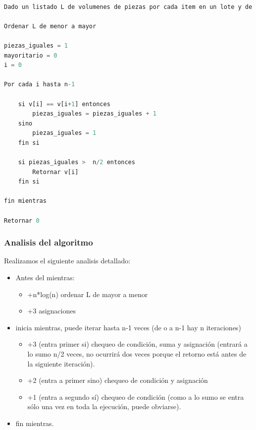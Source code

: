 \documentclass{article}
\begin{document}
\begin{lstlisting}[language=Python, caption=Algoritmo del proceso B]

Dado un listado L de volumenes de piezas por cada item en un lote y de n elementos.

Ordenar L de menor a mayor

piezas_iguales = 1
mayoritario = 0
i = 0

Por cada i hasta n-1 
    
    si v[i] == v[i+1] entonces 
        piezas_iguales = piezas_iguales + 1
    sino
        piezas_iguales = 1
    fin si

    si piezas_iguales >  n/2 entonces
        Retornar v[i]
    fin si

fin mientras

Retornar 0


\end{lstlisting}

\subsubsection{Analisis del algoritmo}

Realizamos el siguiente analisis detallado:

\begin{itemize}
    \item Antes del mientras:
    \begin{itemize}
        \item +n*log(n) ordenar L de mayor a menor
        \item +3 asignaciones
    \end{itemize}
    \item inicia mientras, puede iterar hasta n-1 veces (de o a n-1 hay n iteraciones)
    \begin{itemize}
        \item +3 (entra primer si) chequeo de condición, suma y asignación (entrará a lo sumo n/2 veces, no ocurrirá dos veces porque el retorno está antes de la siguiente iteración).
        \item +2 (entra a primer sino) chequeo de condición y asignación
        \item +1 (entra a segundo sí) chequeo de condición (como a lo sumo se entra sólo una vez en toda la ejecución, puede obviarse).
    \end{itemize}
    \item fin mientras.
\end{itemize}
\end{document}
